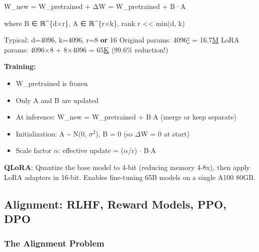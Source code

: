 \documentclass[11pt]{article}
\providecommand{\tightlist}{\setlength{\itemsep}{1pt}\setlength{\parskip}{0pt}}
\newenvironment{Shaded}{\begin{snugshade}}{\end{snugshade}}
\newcommand{\BuiltInTok}[1]{\textcolor[rgb]{0.50,0.55,0.55}{#1}}
\newcommand{\DecValTok}[1]{\textcolor[rgb]{0.96,0.45,0.00}{#1}}
\newcommand{\ErrorTok}[1]{\textcolor[rgb]{0.85,0.27,0.33}{\underline{#1}}}
\newcommand{\FloatTok}[1]{\textcolor[rgb]{0.96,0.45,0.00}{#1}}
\newcommand{\KeywordTok}[1]{\textcolor[rgb]{0.81,0.81,0.76}{\textbf{#1}}}
\newcommand{\NormalTok}[1]{\textcolor[rgb]{0.81,0.81,0.76}{#1}}
\newcommand{\OperatorTok}[1]{\textcolor[rgb]{0.81,0.81,0.76}{#1}}
\begin{document}
\begin{Shaded}
\begin{Highlighting}[]
\NormalTok{W\_new }\OperatorTok{=}\NormalTok{ W\_pretrained }\OperatorTok{+}\NormalTok{ ΔW }\OperatorTok{=}\NormalTok{ W\_pretrained }\OperatorTok{+}\NormalTok{ B·A}

\NormalTok{where B ∈ ℝ}\OperatorTok{\^{}}\NormalTok{\{d×r\}, A ∈ ℝ}\OperatorTok{\^{}}\NormalTok{\{r×k\}, rank r }\OperatorTok{\textless{}\textless{}} \BuiltInTok{min}\NormalTok{(d, k)}

\NormalTok{Typical: d}\OperatorTok{=}\DecValTok{4096}\NormalTok{, k}\OperatorTok{=}\DecValTok{4096}\NormalTok{, r}\OperatorTok{=}\DecValTok{8} \KeywordTok{or} \DecValTok{16}
\NormalTok{Original params: }\DecValTok{4096}\ErrorTok{²} \OperatorTok{=} \FloatTok{16.7}\ErrorTok{M}
\NormalTok{LoRA params:     }\DecValTok{4096}\NormalTok{×}\DecValTok{8} \OperatorTok{+} \DecValTok{8}\NormalTok{×}\DecValTok{4096} \OperatorTok{=} \DecValTok{65}\ErrorTok{K}\NormalTok{  (}\FloatTok{99.6}\OperatorTok{\%}\NormalTok{ reduction}\OperatorTok{!}\NormalTok{)}
\end{Highlighting}
\end{Shaded}

\textbf{Training:}

\begin{itemize}
\tightlist
\item
  W\_pretrained is frozen
\item
  Only A and B are updated
\item
  At inference: W\_new = W\_pretrained + B\(\cdot\)A (merge or keep separate)
\item
  Initialization: A \textasciitilde{} N(0, \(\sigma\)\(^2\)), B = 0 (so \(\Delta\)W = 0 at start)
\item
  Scale factor \(\alpha\): effective update = (\(\alpha\)/r) \(\cdot\) B\(\cdot\)A
\end{itemize}

\textbf{QLoRA}: Quantize the base model to 4-bit (reducing memory 4-8x), then apply LoRA adapters in 16-bit. Enables fine-tuning 65B models on a single A100 80GB.

\subsection{Alignment: RLHF, Reward Models, PPO, DPO}\label{alignment-rlhf-reward-models-ppo-dpo}

\subsubsection{The Alignment Problem}\label{the-alignment-problem}
\end{document}
